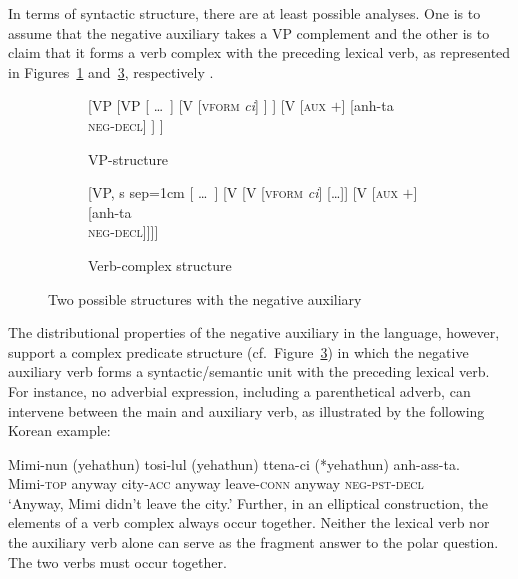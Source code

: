 \documentclass[output=paper
                ,modfonts
                		,nonflat
	        ,collection
	        ,collectionchapter
	        ,collectiontoclongg
 	        ,biblatex
                ,babelshorthands
                ,newtxmath
                ,draftmode
                ,colorlinks, citecolor=brown
]{./langsci/langscibook}
\begin{document}
{\begin{exe}
\begin{xlist}
\begin{exe}
\begin{xlist}
In terms of syntactic structure, there
are at least possible analyses.  One is to assume that the negative auxiliary takes a VP complement and the other is to claim that it forms a verb complex with the preceding lexical verb, as represented in Figures~\ref{fig:3a} and~\ref{fig:3b}, respectively
\citep{Chung98a-u, Kim:16}.
%
\begin{figure}
	\begin{subfigure}[b]{0.48\textwidth}
\centering
		\begin{forest}
			[VP
				[VP
					[ \dots\ ]
					[V {[\textsc{vform} \textit{ci}]}
					]
					]
				[V {[\textsc{aux $+$}]}
					[anh-ta\\ \textsc{neg-decl}]
				]
			]	
		\end{forest}
	\caption{VP-structure}\label{fig:3a}
		\end{subfigure}	
\hfill
	\begin{subfigure}[b]{0.48\textwidth}
\centering
		\begin{forest}
			[VP, s sep=1cm
				[ \dots\ ]
				[V
					[V {[\textsc{vform} \textit{ci}]}
						[\dots]]
					[V {[\textsc{aux $+$}]}
						[anh-ta\\ \textsc{neg-decl}]]]]
		\end{forest}
	\caption{Verb-complex structure}\label{fig:3b}	
		\end{subfigure}
	\caption{Two possible structures with the negative auxiliary}
\end{figure}

The distributional properties of the negative auxiliary in the language, however, support
 a complex predicate structure (cf.\ Figure~\ref{fig:3b}) in which the negative auxiliary verb
forms a syntactic/semantic unit with the preceding lexical verb.
For instance, no adverbial expression, including
a parenthetical adverb, can intervene between
the main and auxiliary verb, as illustrated by the
following Korean example:

\ea
\gll Mimi-nun (yehathun) tosi-lul (yehathun) ttena-ci (*yehathun) anh-ass-ta. \\
     Mimi-\textsc{top} anyway city-\textsc{acc} anyway leave-\textsc{conn} anyway \textsc{neg}-\textsc{pst}-\textsc{decl} \\
\glt `Anyway, Mimi didn't leave the city.'
\z
%
Further, in an elliptical construction, the elements of a verb complex
 always occur together. Neither the lexical  verb nor the auxiliary verb alone can serve
as the fragment answer to the polar question. The two verbs
must occur together.


\end{xlist}
\end{exe}
\end{xlist}
\end{exe}}
\end{document}
